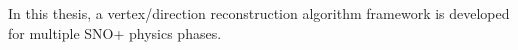 In this thesis, a vertex/direction reconstruction algorithm framework is developed for multiple SNO+ physics phases.

